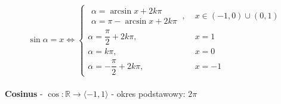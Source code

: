 \documentclass[14pt,a4paper]{extarticle}
\begin{document}
\begin{equation*}
   \sin\alpha = x \Leftrightarrow \left\{
      \begin{array}{ll}
         \begin{array}{l} 
         \!\!\!\!\alpha = \arcsin x + 2k\pi \\
         \!\!\!\!\alpha = \pi - \arcsin x + 2k\pi
         \end{array}\:, \; & x \in (-1, 0) \cup (0, 1) \\[0.6cm]
         \alpha = \dfrac{\pi}{2} + 2k\pi, & x = 1 \\[0.4cm]
         \alpha = k\pi, & x = 0 \\[0.4cm]
         \alpha = -\dfrac{\pi}{2} + 2k\pi, & x = -1 
      \end{array}
   \right.
\end{equation*}
\hfill\break\\
\noindent\textbf{Cosinus} - $\cos: \mathbb{R} \rightarrow \langle-1, 1\rangle $ - okres podstawowy: $2\pi$
\end{document}
